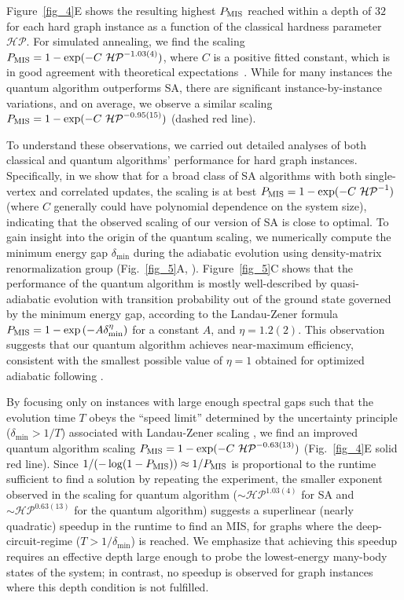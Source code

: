 \documentclass[twocolumn,amssymb,secnumarabic, prl, aps, nofootinbib]{revtex4-1}
\newcommand{\PMIS}{P_\textnormal{MIS}}
\begin{document}
Figure~\ref{fig_4}E shows the resulting highest $\PMIS$ reached within a depth of $32$ for each hard graph instance as a function of the classical hardness parameter $\mathcal{HP}$. For simulated annealing, we find the scaling $\PMIS = 1 - \exp(-C~\mathcal{HP}^{-1.03(4)})$, where $C$ is a positive fitted constant, which is in good agreement with theoretical expectations~\cite{SI}. While for many instances the quantum algorithm outperforms SA, there are significant instance-by-instance variations, and on average, we observe a similar scaling $\PMIS =  1 - \exp(-C~\mathcal{HP}^{-0.95(15)})$ (dashed red line). 

To understand these observations, we carried out detailed analyses of both classical and quantum algorithms' performance for hard graph instances. Specifically, in \cite{SI} we show that for a broad class of SA algorithms with both single-vertex and correlated updates, the scaling is at best $\PMIS = 1 -\exp(-C~\mathcal{HP}^{-1})$ (where $C$ generally could have polynomial dependence on the system size), indicating %
that the observed scaling of our version of SA is close to optimal. To gain insight into the origin of the quantum scaling, we numerically compute the minimum energy gap $\delta_{\text{min}}$ during the adiabatic evolution using density-matrix renormalization group (Fig.~\ref{fig_5}A, \cite{SI}). Figure~\ref{fig_5}C shows that the performance of the quantum algorithm is mostly well-described by quasi-adiabatic evolution with transition probability out of the ground state governed by the minimum energy gap, according to the Landau-Zener formula $\PMIS = 1-\exp{(-A \delta_{\min}^\eta)}$ for a constant $A$, and $\eta = 1.2(2)$\cite{landau_lifshitz}. This observation suggests that our quantum algorithm achieves near-maximum efficiency, consistent with the smallest possible value of $\eta = 1$ obtained for optimized adiabatic following \cite{Roland_optimized_Grover}. 

By focusing only on instances with large enough spectral gaps such that the evolution time $T$ obeys the ``speed limit'' determined by the uncertainty principle ($\delta_{\min}>1/T$) associated with Landau-Zener scaling \cite{landau_lifshitz}, we find an improved quantum algorithm scaling  $\PMIS = 1 - \exp(-C~\mathcal{HP}^{-0.63(13)})$ (Fig.~\ref{fig_4}E solid red line). Since $1/(-\log(1-\PMIS)) \approx 1/\PMIS$ is proportional to the runtime sufficient to find a solution by repeating the experiment, the smaller exponent observed in the scaling for quantum algorithm ($\sim \mathcal{HP}^{1.03(4)}$ for SA and $\sim \mathcal{HP}^{0.63(13)}$ for the quantum algorithm) suggests a superlinear (nearly quadratic) speedup in the runtime to find an MIS, 
for graphs where the deep-circuit-regime ($T > 1/\delta_{\min}$) is reached. We emphasize that achieving this speedup requires an effective depth large enough to probe the lowest-energy many-body states of the system; in contrast, no speedup is observed for graph instances where this depth condition is not fulfilled. \\
\end{document}

